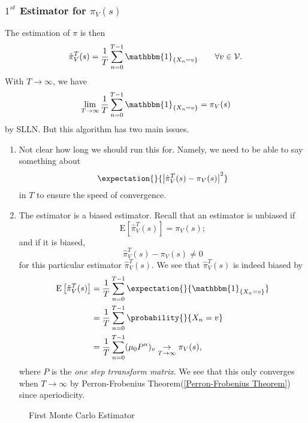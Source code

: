 \subsubsection{\(1^{st}\) Estimator for \(\pi_V(s)\)}
The estimation of \(\pi\) is then
\[
	\hat{\pi}^{T}_{V}(s) = \frac{1}{T}\sum\limits_{n=0}^{T-1} \mathbbm{1}_{\{X_n = v\}}\qquad \forall v\in \mathcal{V}.
\]
With \(T\to \infty \), we have
\[
	\lim_{T\to \infty}\frac{1}{T} \sum\limits_{n=0}^{T-1} \mathbbm{1}_{\{X_n = v\}} = \pi_V(s)
\]
by SLLN. But this algorithm has two main issues.
\begin{enumerate}
	\item Not clear how long we should run this for. Namely, we need to be able to say something about
	      \[
		      \expectation{}{\left\vert \hat{\pi}^{T}_V(s) - \pi_V(s) \right\vert^2 }
	      \]
	      in \(T\) to ensure the speed of convergence.
	\item The estimator is a biased estimator. Recall that an estimator is unbiased if
	      \[
		      \mathrm{E}\left[ \hat{\pi}_{V}^{T}(s) \right] = \pi_V(s);
	      \]
	      and if it is biased,
	      \[
		      \hat{\pi}_{V}^{T}(s) - \pi_V(s)\neq 0
	      \]
	      for this particular estimator \(\hat{\pi}^{T}_V(s)\). We see that \(\hat{\pi}^{T}_V(s)\) is indeed biased by
	      \[
		      \begin{split}
			      \mathrm{E}\left[\hat{\pi}^{T}_V(s)\right] &= \frac{1}{T}\sum\limits_{n=0}^{T-1} \expectation{}{\mathbbm{1}_{\{X_n = v\}}}\\
			      &= \frac{1}{T}\sum\limits_{n=0}^{T-1} \probability{}{X_n = v} \\
			      &= \frac{1}{T}\sum\limits_{n=0}^{T-1} (\mu_0 P^n)_v\underset{T\to \infty }{\to }\pi_V(s),
		      \end{split}
	      \]
	      where \(P\) is the \emph{one step trransform matrix}. We see that this only converges when \(T\to \infty \) by Perron-Frobenius Theorem(\autoref{Perron-Frobenius Theorem})
	      since aperiodicity.
\end{enumerate}

\begin{figure}[H]
	\centering
	\caption{First Monte Carlo Estimator}
	\label{fig:Monte-Carlo-Estimator-1}
\end{figure}

